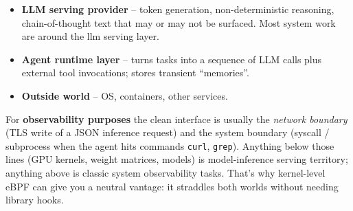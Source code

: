 \documentclass[sigplan,screen，review,9pt]{acmart}
\begin{document}
\begin{comment}
    

\begin{center}
    
\begin{Verbatim}[fontsize=\small, commandchars=\\\{\}]
┌───────────────────────────────────────────────┐
│          ☁  Rest of workspace / system       │
│  (APIs, DBs, message bus, OS, Kubernetes…)    │
│                                               │
│   ┌───────────────────────────────────────┐   │
│   │       Agent runtime / framework       │   │
│   │ (LangChain, claude-code, gemini-cli …)│   │
│   │  • orchestrates prompts & tool calls  │   │
│   │  • owns scratch memory / vector DB    │   │
│   └───────────────────────────────────────┘   │
│               ↑ outbound API calls            │
│───────────────────────────────────────────────│
│               ↓ inbound events                │
│   ┌───────────────────────────────────────┐   │
│   │          LLM serving provider         │   │
│   │    (OpenAI endpoint, local llama.cpp) │   │
│   └───────────────────────────────────────┘   │
└───────────────────────────────────────────────┘
\end{Verbatim}
\end{center}
\end{comment}


\begin{itemize}
  \item \textbf{LLM serving provider} – token generation, non-deterministic reasoning, chain-of-thought text that may or may not be surfaced. Most system work are around the llm serving layer.
  \item \textbf{Agent runtime layer} – turns tasks into a sequence of LLM calls plus external tool invocations; stores transient ``memories''.
  \item \textbf{Outside world} – OS, containers, other services.
\end{itemize}

For \textbf{observability purposes} the clean interface is usually the \emph{network boundary} (TLS write of a JSON inference request) and the system boundary (syscall / subprocess when the agent hits commands \verb|curl|, \verb|grep|).  Anything below those lines (GPU kernels, weight matrices, models) is model-inference serving territory; anything above is classic system observability tasks.  That’s why kernel-level eBPF can give you a neutral vantage: it straddles both worlds without needing library hooks.
\end{document}

